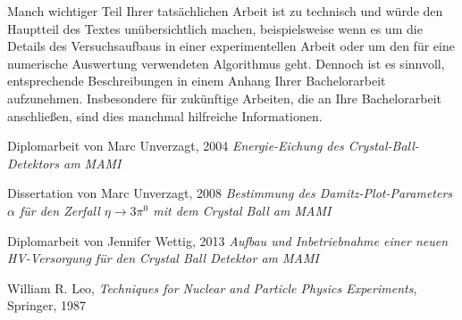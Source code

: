 \documentclass[a4paper,11pt,oneside,final,german,openbib,pdftex]{scrbook}
\begin{document}
{\begin{appendix}
Manch wichtiger Teil Ihrer tats\"achlichen Arbeit ist zu technisch 
und w\"urde den Hauptteil des Textes un\"ubersichtlich machen, 
beispielsweise wenn es um die Details des Versuchsaufbaus in einer 
experimentellen Arbeit oder um den f\"ur eine numerische Auswertung 
verwendeten Algorithmus geht. Dennoch ist es sinnvoll, entsprechende 
Beschreibungen in einem Anhang Ihrer Bachelorarbeit aufzunehmen. 
Insbesondere f\"ur zuk\"unftige Arbeiten, die an Ihre Bachelorarbeit 
anschlie{\ss}en, sind dies manchmal hilfreiche Informationen.





\renewcommand{\bibname}{\bfont Literaturverzeichnis} 

\begin{thebibliography}{99}
	
 Diplomarbeit von Marc Unverzagt, 2004 {\em Energie-Eichung des Crystal-Ball-Detektors am MAMI}

 Dissertation von Marc Unverzagt, 2008 {\em Bestimmung des Damitz-Plot-Parameters $\alpha$ für den Zerfall $ \eta \rightarrow 3\pi^{0} $ mit dem Crystal Ball am MAMI}

 Diplomarbeit von Jennifer Wettig, 2013 {\em Aufbau und Inbetriebnahme einer neuen HV-Versorgung für den Crystal Ball Detektor am MAMI}

 William R. Leo, \textit{Techniques for Nuclear and Particle Physics Experiments}, Springer, 1987



\end{thebibliography}
\end{appendix}}
\end{document}
